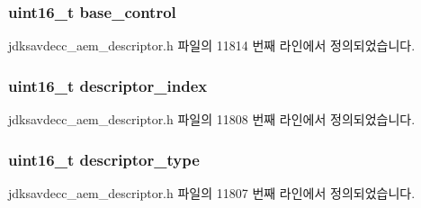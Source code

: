\subsubsection[{\texorpdfstring{base\+\_\+control}{base_control}}]{\setlength{\rightskip}{0pt plus 5cm}uint16\+\_\+t base\+\_\+control}\hypertarget{structjdksavdecc__descriptor__jack_af06eac7dd98377a85258308e8a25e7f2}{}\label{structjdksavdecc__descriptor__jack_af06eac7dd98377a85258308e8a25e7f2}


jdksavdecc\+\_\+aem\+\_\+descriptor.\+h 파일의 11814 번째 라인에서 정의되었습니다.

\subsubsection[{\texorpdfstring{descriptor\+\_\+index}{descriptor_index}}]{\setlength{\rightskip}{0pt plus 5cm}uint16\+\_\+t descriptor\+\_\+index}\hypertarget{structjdksavdecc__descriptor__jack_a042bbc76d835b82d27c1932431ee38d4}{}\label{structjdksavdecc__descriptor__jack_a042bbc76d835b82d27c1932431ee38d4}


jdksavdecc\+\_\+aem\+\_\+descriptor.\+h 파일의 11808 번째 라인에서 정의되었습니다.

\subsubsection[{\texorpdfstring{descriptor\+\_\+type}{descriptor_type}}]{\setlength{\rightskip}{0pt plus 5cm}uint16\+\_\+t descriptor\+\_\+type}\hypertarget{structjdksavdecc__descriptor__jack_ab7c32b6c7131c13d4ea3b7ee2f09b78d}{}\label{structjdksavdecc__descriptor__jack_ab7c32b6c7131c13d4ea3b7ee2f09b78d}


jdksavdecc\+\_\+aem\+\_\+descriptor.\+h 파일의 11807 번째 라인에서 정의되었습니다.

